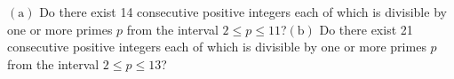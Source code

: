 $(\text{a})$ Do there exist 14 consecutive positive integers each of which is divisible by one or more primes $p$ from the interval $2\le p \le 11$?$(\text{b})$ Do there exist 21 consecutive positive integers each of which is divisible by one or more primes $p$ from the interval $2\le p \le 13$?